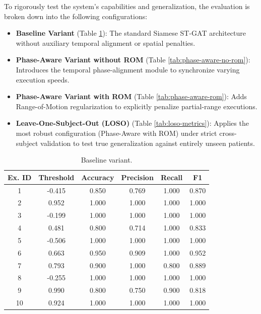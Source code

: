 To rigorously test the system's capabilities and generalization, the evaluation is broken down into the following configurations:
\begin{itemize}
    \item \textbf{Baseline Variant} (Table \ref{tab:baseline}): The standard Siamese ST-GAT architecture without auxiliary temporal alignment or spatial penalties.
    \item \textbf{Phase-Aware Variant without ROM} (Table \ref{tab:phase-aware-no-rom}): Introduces the temporal phase-alignment module to synchronize varying execution speeds.
    \item \textbf{Phase-Aware Variant with ROM} (Table \ref{tab:phase-aware-rom}): Adds Range-of-Motion regularization to explicitly penalize partial-range executions.
    \item \textbf{Leave-One-Subject-Out (LOSO)} (Table \ref{tab:loso-metrics}): Applies the most robust configuration (Phase-Aware with ROM) under strict cross-subject validation to test true generalization against entirely unseen patients.
\end{itemize}

\begin{table}[htbp]
    \centering
    \caption{Baseline variant.}
    \label{tab:baseline}
    \begin{tabularx}{0.8\textwidth}{@{} c c c c c c @{}}
        \toprule
        \textbf{Ex. ID} & \textbf{Threshold} & \textbf{Accuracy} & \textbf{Precision} & \textbf{Recall} & \textbf{F1} \\
        \midrule
        1  & -0.415 & 0.850 & 0.769 & 1.000 & 0.870 \\
        2  &  0.952 & 1.000 & 1.000 & 1.000 & 1.000 \\
        3  & -0.199 & 1.000 & 1.000 & 1.000 & 1.000 \\
        4  &  0.481 & 0.800 & 0.714 & 1.000 & 0.833 \\
        5  & -0.506 & 1.000 & 1.000 & 1.000 & 1.000 \\
        6  &  0.663 & 0.950 & 0.909 & 1.000 & 0.952 \\
        7  &  0.793 & 0.900 & 1.000 & 0.800 & 0.889 \\
        8  & -0.255 & 1.000 & 1.000 & 1.000 & 1.000 \\
        9  &  0.990 & 0.800 & 0.750 & 0.900 & 0.818 \\
        10 &  0.924 & 1.000 & 1.000 & 1.000 & 1.000 \\
        \bottomrule
    \end{tabularx}
\end{table}

